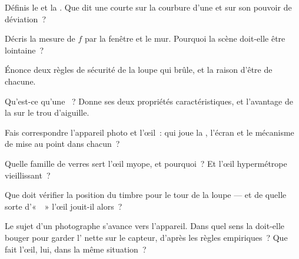 \begin{exercise}[$\star$]\label{exo:g8:lenses-images:2}
Définis le  et la . Que dit une courte  sur la courbure d'une  et sur son pouvoir de
déviation~?
\end{exercise}

\begin{exercise}[$\star$]\label{exo:g8:lenses-images:3}
Décris la mesure de $f$ par la fenêtre et le mur. Pourquoi la scène
doit-elle être lointaine~?
\end{exercise}

\begin{exercise}[$\star$]\label{exo:g8:lenses-images:4}
Énonce deux règles de sécurité de la loupe qui brûle, et la raison
d'être de chacune.
\end{exercise}

\begin{exercise}[$\star$]\label{exo:g8:lenses-images:5}
Qu'est-ce qu'une ~? Donne ses deux propriétés
caractéristiques, et l'avantage de la  sur le trou
d'aiguille.
\end{exercise}

\begin{exercise}[$\star$]\label{exo:g8:lenses-images:6}
Fais correspondre l'appareil photo et l'œil~: qui joue la ,
l'écran et le mécanisme de mise au point dans chacun~?
\end{exercise}

\begin{exercise}[$\star$]\label{exo:g8:lenses-images:7}
Quelle famille de verres sert l'œil myope, et pourquoi~? Et l'œil
hypermétrope vieillissant~?
\end{exercise}

\begin{exercise}[$\star$]\label{exo:g8:lenses-images:8}
Que doit vérifier la position du timbre pour le tour de la loupe ---
et de quelle sorte d'«~~» l'œil jouit-il alors~?
\end{exercise}

\begin{exercise}[$\star\star$]\label{exo:g8:lenses-images:9}
Le sujet d'un photographe s'avance vers l'appareil. Dans quel sens la
 doit-elle bouger pour garder l' nette sur le capteur,
d'après les règles empiriques~? Que fait l'œil, lui, dans la même
situation~?
\end{exercise}

